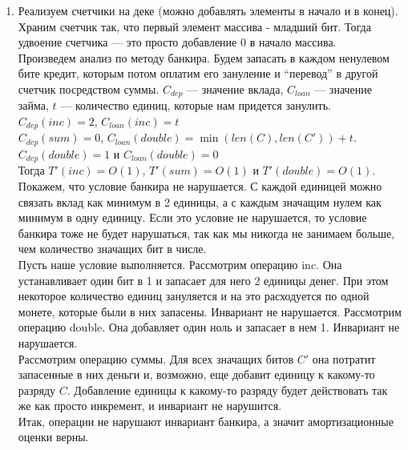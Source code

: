 \documentclass[10pt]{article}
\begin{document}
\begin{enumerate}
	\item Реализуем счетчики на деке (можно добавлять элементы в начало и в конец). Храним счетчик так, что первый элемент массива - младший бит. Тогда удвоение счетчика --- это просто добавление 0 в начало массива.\\
	Произведем анализ по методу банкира. Будем запасать в каждом ненулевом бите кредит, которым потом оплатим его зануление и ``перевод'' в другой счетчик посредством суммы. $C_{dep}$ --- значение вклада, $C_{loan}$ --- значение займа, $t$ --- количество единиц, которые нам придется занулить.\\
	$C_{dep}(inc) = 2$, $C_{loan}(inc) = t$\\
	$C_{dep}(sum) = 0$, $C_{loan}(double) = \min(len(C), len(C')) + t$.
	$C_{dep}(double) = 1$ и $C_{loan}(double)=0$\\
	Тогда $T'(inc) = O(1)$, $T'(sum) = O(1)$ и $T'(double)=O(1)$.\\
	Покажем, что условие банкира не нарушается. С каждой единицей можно связать вклад как минимум в 2 единицы, а с каждым значащим нулем как минимум в одну единицу. Если это условие не нарушается, то условие банкира тоже  не будет нарушаться, так как мы никогда не занимаем больше, чем количество значащих бит в числе.\\
	Пусть наше условие выполняется. Рассмотрим операцию inc. Она устанавливает один бит в 1 и запасает для него 2 единицы денег. При этом некоторое количество единиц зануляется и на это расходуется по одной монете, которые были в них запасены. Инвариант не нарушается.
	Рассмотрим операцию double. Она добавляет один ноль и запасает в нем 1. Инвариант не нарушается.\\
	Рассмотрим операцию суммы. Для всех значащих битов $C'$ она потратит запасенные в них деньги и, возможно, еще добавит единицу к какому-то разряду $C$. Добавление единицы к какому-то разряду будет действовать так же как просто инкремент, и инвариант не нарушится.\\
	Итак, операции не нарушают инвариант банкира, а значит амортизационные оценки верны.
	

\end{enumerate}
\end{document}
